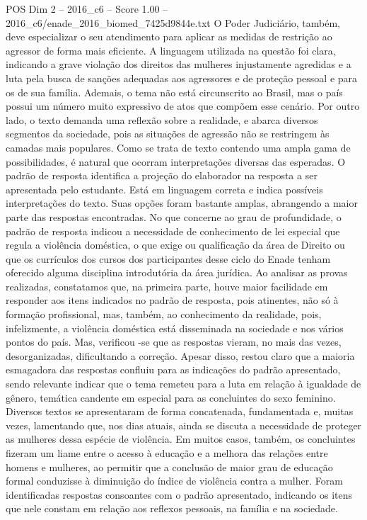 \begin{textsample}{POS Dim 2 – 2016\_c6 – Score 1.00 – 2016\_c6/enade\_2016\_biomed\_7425d9844e.txt}
O Poder Judiciário, também, deve especializar o seu atendimento para aplicar as medidas de restrição ao agressor de forma mais eficiente.
A linguagem utilizada na questão foi clara, indicando a grave violação dos direitos das mulheres injustamente agredidas e a luta pela busca de sanções adequadas aos agressores e de proteção pessoal e para os de sua família.
Ademais, o tema não está circunscrito ao Brasil, mas o país possui um número muito expressivo de atos que compõem esse cenário.
Por outro lado, o texto demanda uma reflexão sobre a realidade, e abarca diversos segmentos da sociedade, pois as situações de agressão não se restringem às camadas mais populares.
Como se trata de texto contendo uma ampla gama de possibilidades, é natural que ocorram interpretações diversas das esperadas.
O padrão de resposta identifica a projeção do elaborador na resposta a ser apresentada pelo estudante.
Está em linguagem correta e indica possíveis interpretações do texto.
Suas opções foram bastante amplas, abrangendo a maior parte das respostas encontradas.
No que concerne ao grau de profundidade, o padrão de resposta indicou a necessidade de conhecimento de lei especial que regula a violência doméstica, o que exige ou qualificação da área de Direito ou que os currículos dos cursos dos participantes desse ciclo do Enade tenham oferecido alguma disciplina introdutória da área jurídica.
Ao analisar as provas realizadas, constatamos que, na primeira parte, houve maior facilidade em responder aos itens indicados no padrão de resposta, pois atinentes, não só à formação profissional, mas, também, ao conhecimento da realidade, pois, infelizmente, a violência doméstica está disseminada na sociedade e nos vários pontos do país.
Mas, verificou -se que as respostas vieram, no mais das vezes, desorganizadas, dificultando a correção.
Apesar disso, restou claro que a maioria esmagadora das respostas confluiu para as indicações do padrão apresentado, sendo relevante indicar que o tema remeteu para a luta em relação à igualdade de gênero, temática candente em especial para as concluintes do sexo feminino.
Diversos textos se apresentaram de forma concatenada, fundamentada e, muitas vezes, lamentando que, nos dias atuais, ainda se discuta a necessidade de proteger as mulheres dessa espécie de violência.
Em muitos casos, também, os concluintes fizeram um liame entre o acesso à educação e a melhora das relações entre homens e mulheres, ao permitir que a conclusão de maior grau de educação formal conduzisse à diminuição do índice de violência contra a mulher.
Foram identificadas respostas consoantes com o padrão apresentado, indicando os itens que nele constam em relação aos reflexos pessoais, na família e na sociedade.

\end{textsample}
